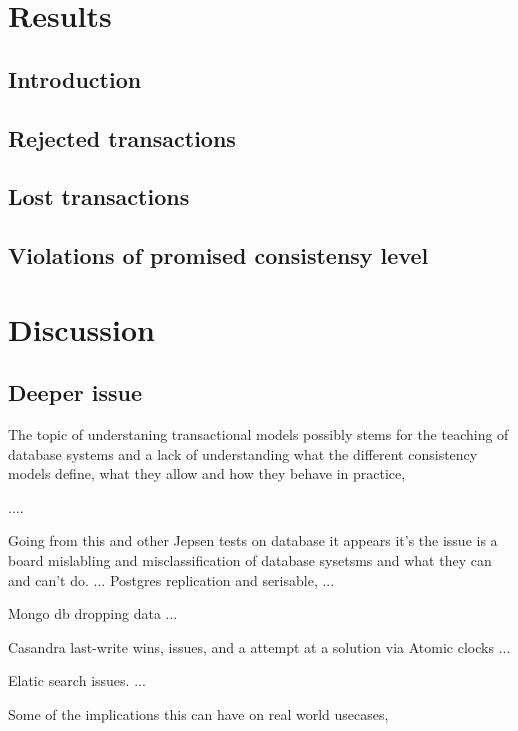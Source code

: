 \documentclass[a4paper,10pt,titlepage]{report}
\begin{document}
%
\section{Results}

\subsection{Introduction}


\subsection{Rejected transactions}


\subsection{Lost transactions}


\subsection{Violations of promised consistensy level}




\section{Discussion}



\subsection{Deeper issue}
The topic of understaning transactional models possibly stems for the teaching of database systems and a lack of understanding what the different consistency models define, what they allow and how they behave in practice,

....


Going from this and other Jepsen tests on database it appears it's the issue is a board mislabling and misclassification of database sysetsms and what they can and can't do.
...
Postgres replication and serisable,
...

Mongo db dropping data
...

Casandra last-write wins, issues, and a attempt at a solution via Atomic clocks
...

Elatic search issues.
...

Some of the implications this can have on real world usecases, 
\end{document}
